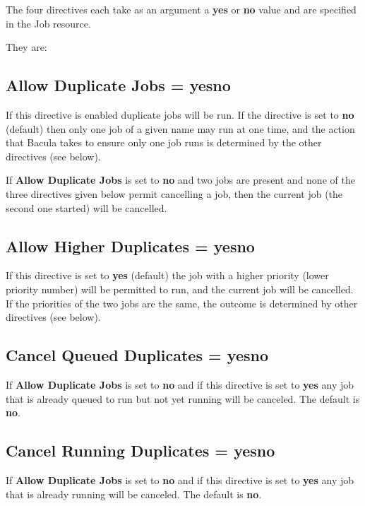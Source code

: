 The four directives each take as an argument a {\bf yes} or {\bf no} value and
are specified in the Job resource.

They are:

\subsection{Allow Duplicate Jobs = \lt{}yes\vb{}no\gt{}}
  If this directive is enabled duplicate jobs will be run.  If
  the directive is set to {\bf no} (default) then only one job of a given name
  may run at one time, and the action that Bacula takes to ensure only
  one job runs is determined by the other directives (see below).
 
  If {\bf Allow Duplicate Jobs} is set to {\bf no} and two jobs
  are present and none of the three directives given below permit
  cancelling a job, then the current job (the second one started)
  will be cancelled.


\subsection{Allow Higher Duplicates = \lt{}yes\vb{}no\gt{}}
  If this directive is set to {\bf yes} (default) the job with a higher
  priority (lower priority number) will be permitted to run, and
  the current job will be cancelled.  If the
  priorities of the two jobs are the same, the outcome is determined by
  other directives (see below).

\subsection{Cancel Queued Duplicates = \lt{}yes\vb{}no\gt{}}
  If {\bf Allow Duplicate Jobs} is set to {\bf no} and
  if this directive is set to {\bf yes} any job that is
  already queued to run but not yet running will be canceled.
  The default is {\bf no}. 

\subsection{Cancel Running Duplicates = \lt{}yes\vb{}no\gt{}}
  If {\bf Allow Duplicate Jobs} is set to {\bf no} and
  if this directive is set to {\bf yes} any job that is already running
  will be canceled.  The default is {\bf no}.


